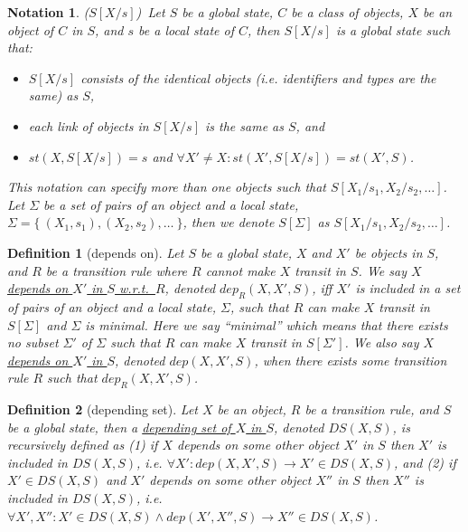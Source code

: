\documentclass[12pt]{report}
\newtheorem{notation}{Notation}
\newtheorem{definition}{Definition}
\newcommand{\ra}{\rightarrow}
\newcommand{\ul}{\underline}
\begin{document}
\begin{notation}($S[X/s]$)\
Let $S$ be a global state, $C$ be a class of objects, $X$ be an object
of $C$ in $S$, and $s$ be a local state of $C$, then
\ul{$S[X/s]$} is a global state such that:
\begin{itemize}
\item $S[X/s]$ consists of the identical objects (i.e. identifiers and
  types are the same) as $S$,
\item each link of objects in $S[X/s]$ is the same as $S$, and
\item $st(X,S[X/s])=s$ and $\forall X'\ne X:st(X',S[X/s])=st(X',S)$.
\end{itemize}
This notation can specify more than one objects such that
\ul{$S[X_1/s_1,X_2/s_2,\dots]$}.  Let $\Sigma$ be a set of pairs of
an object and a local state, $\Sigma = \{~ (X_1,s_1), (X_2,s_2), \dots~\}$,
then we denote \ul{$S[\Sigma]$} as $S[X_1/s_1,X_2/s_2,\dots]$.
\end{notation}

\begin{definition}[depends on]
Let $S$ be a global state, $X$ and $X'$ be objects in $S$, and $R$ be
a transition rule where $R$ cannot make $X$ transit in $S$.  We say
\ul{$X$ depends on $X'$ in $S$ w.r.t.\ $R$}, denoted \ul{$dep_R(X,
  X',S)$}, iff $X'$ is included in a set of pairs of an object and a
local state, $\Sigma$, such that $R$ can make $X$ transit in
$S[\Sigma]$ and $\Sigma$ is minimal.  Here we say ``minimal'' which
means that there exists no subset $\Sigma'$ of $\Sigma$ such that $R$
can make $X$ transit in $S[\Sigma']$. We also say \ul{$X$ depends on
  $X'$ in $S$}, denoted \ul{$dep(X, X',S)$}, when there exists some
transition rule $R$ such that $dep_R(X,X',S)$.
\end{definition}

\begin{definition}[depending set]
Let $X$ be an object, $R$ be a transition rule, and $S$ be a global
state, then a \ul{depending set of $X$ in $S$}, denoted
\ul{$DS(X,S)$}, is recursively defined as (1) if $X$ depends on some
other object $X'$ in $S$ then $X'$ is included in
$DS(X,S)$, i.e. $\forall X': dep(X,X',S) \ra X'\in DS(X,S)$, and
(2) if $X' \in DS(X,S)$ and $X'$ depends on some other object $X''$
in $S$ then $X''$ is included in $DS(X,S)$, i.e. $\forall
X',X'':X'\in DS(X,S) \land dep(X',X'',S) \ra X''\in DS(X,S)$.
\end{definition}
\end{document}
